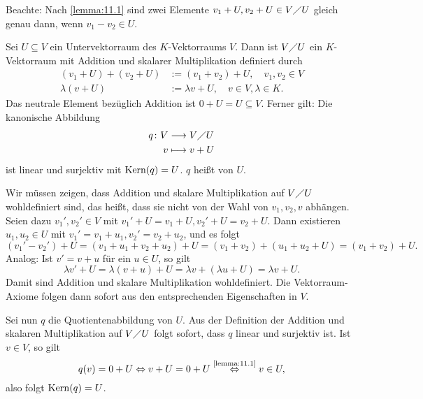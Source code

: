 Beachte: Nach \autoref{lemma:11.1} sind zwei Elemente $v_1+U, v_2 +U \in V \diagup U$ gleich genau dann, wenn $v_1 - v_2 \in U$.

\begin{satz}[Quotientenabbildung]
	\label{satz:11.3}
	Sei $U \subseteq V$ ein Untervektorraum des $K$-Vektorraums $V$.
	Dann ist $V \diagup U$ ein $K$-Vektorraum mit Addition und skalarer Multiplikation definiert durch
	\begin{align*}
		(v_1 + U) + (v_2 + U) &:= (v_1 + v_2) + U, \quad v_1,v_2 \in V \\
		\lambda (v+U) &:= \lambda v + U, \quad v \in V, \lambda \in K.
	\end{align*}
	Das neutrale Element bezüglich Addition ist $0 + U = U \subseteq V$.
	Ferner gilt:
	Die kanonische Abbildung
	\begin{align*}
		q\colon V &\longrightarrow V \diagup U \\
		v &\longmapsto v+U
	\end{align*}
	ist linear und surjektiv mit $\operatorname{Kern}(q) = U$.
	$q$ heißt  von $U$.
\end{satz}

\begin{beweis}
	Wir müssen zeigen, dass Addition und skalare Multiplikation auf $V \diagup U$ wohldefiniert sind, das heißt, dass sie nicht von der Wahl von $v_1,v_2,v$ abhängen.
	Seien dazu $v_1',v_2' \in V$ mit $v_1' + U = v_1 + U, v_2' + U = v_2 + U$.
	Dann existieren $u_1,u_2 \in U$ mit $v_1' = v_1 + u_1, v_2' = v_2+u_2$, und es folgt
	\[
		(v_1'-v_2')+U = (v_1+u_1+v_2+u_2)+U = (v_1+v_2) + (u_1+u_2+U) = (v_1+v_2) + U.
	\]
	Analog: Ist $v' = v+u$ für ein $u \in U$, so gilt
	\[
		\lambda v' + U = \lambda(v+u)+U = \lambda v + (\lambda u + U) = \lambda v + U.
	\]
	Damit sind Addition und skalare Multiplikation wohldefiniert.
	Die Vektorraum-Axiome folgen dann sofort aus den entsprechenden Eigenschaften in $V$.
	
	Sei nun $q$ die Quotientenabbildung von $U$.
	Aus der Definition der Addition und skalaren Multiplikation auf $V \diagup U$ folgt sofort, dass $q$ linear und surjektiv ist.
	Ist $v \in V$, so gilt
	\[
		q(v) = 0 + U \Leftrightarrow v+ U = 0+U \stackrel{\text{\ref{lemma:11.1}}}{\Leftrightarrow} v \in U,
	\]
	also folgt $\operatorname{Kern}(q) = U$. \qedhere
\end{beweis}

